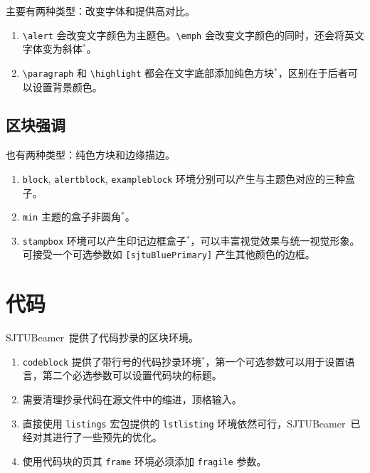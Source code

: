 \documentclass[
    UTF8,
    heading=true,
    12pt,
    a4paper
]{ctexrep}
\newenvironment{commentlist}{\begin{enumerate}\small}{\end{enumerate}}
\def\themename{\textsf{SJTUBeamer}}
\begin{document}
主要有两种类型：改变字体和提供高对比。


\begin{commentlist}
  \item \texttt{\textbackslash{}alert} 会改变文字颜色为主题色。\texttt{\textbackslash{}emph} 会改变文字颜色的同时，还会将英文字体变为斜体$^*$。
  \item \texttt{\textbackslash{}paragraph} 和 \texttt{\textbackslash{}highlight} 都会在文字底部添加纯色方块$^*$，区别在于后者可以设置背景颜色。
\end{commentlist}

\section{区块强调}

也有两种类型：纯色方块和边缘描边。



\begin{commentlist}
  \item \texttt{block}, \texttt{alertblock}, \texttt{exampleblock} 环境分别可以产生与主题色对应的三种盒子。
  \item \texttt{min} 主题的盒子非圆角$^*$。
  \item \texttt{stampbox} 环境可以产生印记边框盒子$^*$，可以丰富视觉效果与统一视觉形象。可接受一个可选参数如 \texttt{[sjtuBluePrimary]} 产生其他颜色的边框。
\end{commentlist}

\chapter{代码}

\themename\ 提供了代码抄录的区块环境。


\begin{commentlist}
  \item \texttt{codeblock} 提供了带行号的代码抄录环境$^*$，第一个可选参数可以用于设置语言，第二个必选参数可以设置代码块的标题。
  \item 需要清理抄录代码在源文件中的缩进，顶格输入。
  \item 直接使用 \texttt{listings} 宏包提供的 \texttt{lstlisting} 环境依然可行，\themename\ 已经对其进行了一些预先的优化。
  \item[\faExclamationTriangle] 使用代码块的页其 \texttt{frame} 环境必须添加 \texttt{fragile} 参数。
\end{commentlist}
\end{document}
